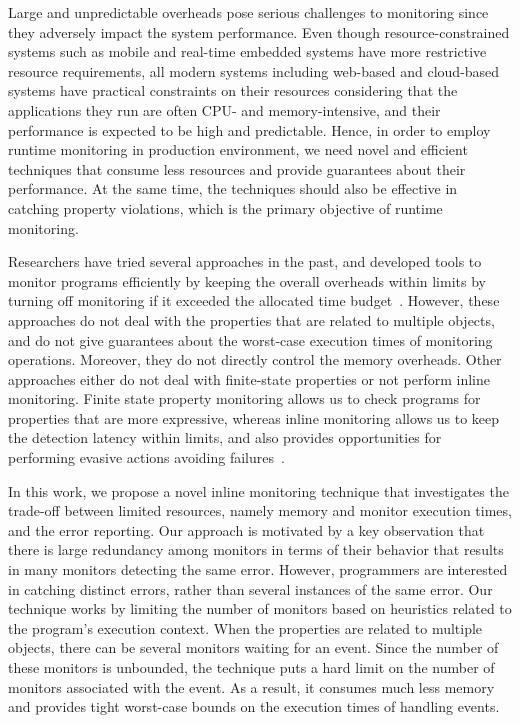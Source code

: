 Large and unpredictable overheads pose serious challenges to monitoring since 
they adversely impact the system performance.
Even though resource-constrained systems such as mobile and real-time embedded 
systems have more restrictive resource requirements, all modern systems 
including
web-based and cloud-based systems have practical constraints on their resources 
considering that the applications they run are often CPU- and memory-intensive, 
and their performance is expected to be high and predictable. Hence, in order to 
employ runtime monitoring in production environment, we need novel and efficient 
techniques that consume less resources and provide guarantees about their 
performance. At the same time, the techniques should also be effective in 
catching property violations, which is the primary objective of runtime 
monitoring.

Researchers have tried several approaches in the past, and developed tools to 
monitor programs efficiently by keeping the overall overheads within limits by 
turning off monitoring if it exceeded the allocated time
budget~\cite{Arnold:OOPSLA08, BartocciGKSSZS12, StollerBSGHSZ11}. 
However, these approaches do not deal with the properties that are related to 
multiple objects, and do not give guarantees about the worst-case execution 
times of monitoring operations. Moreover, they do not directly control the 
memory overheads. Other approaches either do not deal with finite-state 
properties or not perform inline monitoring. Finite state property 
monitoring allows us to check programs for properties that are more expressive, 
whereas inline monitoring allows us to keep the detection latency within limits, 
and also provides opportunities for performing evasive actions avoiding 
failures~\cite{DwyerPP10}.

In this work, we propose a novel inline monitoring technique that investigates 
the trade-off between limited resources, namely memory and monitor execution 
times, and the error reporting. Our approach is motivated by a key 
observation that there is large redundancy among monitors in terms of their 
behavior that results in many monitors detecting the same error. However, 
programmers are interested in catching distinct errors, rather than several 
instances of the same error. Our technique works by limiting the number of 
monitors based on heuristics related to the program's execution context. When 
the properties are related to multiple objects, there can be several monitors 
waiting for an event. Since the number of these monitors is unbounded, the 
technique puts a hard limit on the number of monitors associated with the 
event. As a result, 
it consumes much less memory and provides tight worst-case bounds on the 
execution times of handling events.

